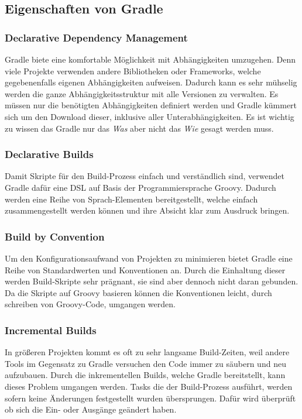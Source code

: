 \subsection{Eigenschaften von Gradle}
\subsubsection{Declarative Dependency Management}
Gradle biete eine komfortable Möglichkeit mit Abhängigkeiten umzugehen. Denn viele Projekte verwenden andere Bibliotheken oder Frameworks, welche gegebenenfalls eigenen Abhängigkeiten aufweisen. Dadurch kann es sehr mühselig werden die ganze Abhängigkeitsstruktur mit alle Versionen zu verwalten. Es müssen nur die benötigten Abhängigkeiten definiert werden und Gradle kümmert sich um den Download dieser, inklusive aller Unterabhängigkeiten. Es ist wichtig zu wissen das Gradle nur das \textit{Was} aber nicht das \textit{Wie} gesagt werden muss.

\subsubsection{Declarative Builds}
Damit Skripte für den Build-Prozess einfach und verständlich sind, verwendet Gradle dafür eine \gls{DSL} auf Basis der Programmiersprache Groovy. Dadurch werden eine Reihe von Sprach-Elementen bereitgestellt, welche einfach zusammengestellt werden können und ihre Absicht klar zum Ausdruck bringen.

\subsubsection{Build by Convention}
Um den Konfigurationsaufwand von Projekten zu minimieren bietet Gradle eine Reihe von Standardwerten und Konventionen an. Durch die Einhaltung dieser werden Build-Skripte sehr prägnant, sie sind aber dennoch nicht daran gebunden. Da die Skripte auf Groovy basieren können die Konventionen leicht, durch schreiben von Groovy-Code, umgangen werden.

\subsubsection{Incremental Builds}
In größeren Projekten kommt es oft zu sehr langsame Build-Zeiten, weil andere Tools im Gegensatz zu Gradle versuchen den Code immer zu säubern und neu aufzubauen. Durch die inkrementellen Builds, welche Gradle bereitstellt, kann dieses Problem umgangen werden. Tasks die der Build-Prozess ausführt, werden sofern keine Änderungen festgestellt wurden übersprungen. Dafür wird überprüft ob sich die Ein- oder Ausgänge geändert haben.

